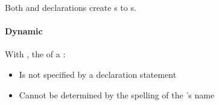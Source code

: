 \begin{remark*}
  Both  and  declarations create  s to s.
\end{remark*}

\paragraph{Dynamic  }\label{par:Dynamic_Variable_Type_Binding}
With , the  of a :
\begin{itemize}[noitemsep]
\item Is not specified by a declaration statement
\item Cannot be determined by the spelling of the 's name
\end{itemize}

